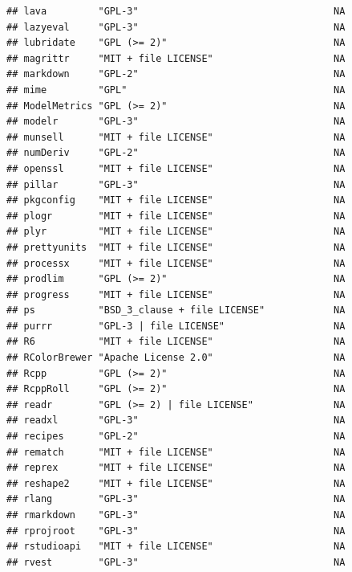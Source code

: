 \documentclass[]{article}
\begin{document}
\begin{verbatim}
## lava         "GPL-3"                                  NA             
## lazyeval     "GPL-3"                                  NA             
## lubridate    "GPL (>= 2)"                             NA             
## magrittr     "MIT + file LICENSE"                     NA             
## markdown     "GPL-2"                                  NA             
## mime         "GPL"                                    NA             
## ModelMetrics "GPL (>= 2)"                             NA             
## modelr       "GPL-3"                                  NA             
## munsell      "MIT + file LICENSE"                     NA             
## numDeriv     "GPL-2"                                  NA             
## openssl      "MIT + file LICENSE"                     NA             
## pillar       "GPL-3"                                  NA             
## pkgconfig    "MIT + file LICENSE"                     NA             
## plogr        "MIT + file LICENSE"                     NA             
## plyr         "MIT + file LICENSE"                     NA             
## prettyunits  "MIT + file LICENSE"                     NA             
## processx     "MIT + file LICENSE"                     NA             
## prodlim      "GPL (>= 2)"                             NA             
## progress     "MIT + file LICENSE"                     NA             
## ps           "BSD_3_clause + file LICENSE"            NA             
## purrr        "GPL-3 | file LICENSE"                   NA             
## R6           "MIT + file LICENSE"                     NA             
## RColorBrewer "Apache License 2.0"                     NA             
## Rcpp         "GPL (>= 2)"                             NA             
## RcppRoll     "GPL (>= 2)"                             NA             
## readr        "GPL (>= 2) | file LICENSE"              NA             
## readxl       "GPL-3"                                  NA             
## recipes      "GPL-2"                                  NA             
## rematch      "MIT + file LICENSE"                     NA             
## reprex       "MIT + file LICENSE"                     NA             
## reshape2     "MIT + file LICENSE"                     NA             
## rlang        "GPL-3"                                  NA             
## rmarkdown    "GPL-3"                                  NA             
## rprojroot    "GPL-3"                                  NA             
## rstudioapi   "MIT + file LICENSE"                     NA             
## rvest        "GPL-3"                                  NA             

\end{verbatim}
\end{document}
